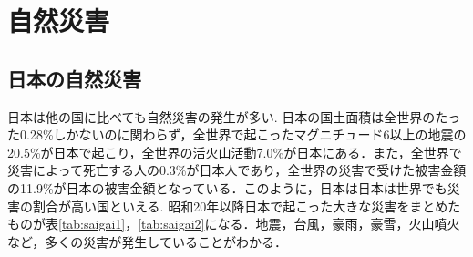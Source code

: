 \documentclass[a4j,11pt]{jsarticle}
\begin{document}



\newpage

\section{自然災害}
\subsection{日本の自然災害}
日本は他の国に比べても自然災害の発生が多い.
日本の国土面積は全世界のたった0.28\%しかないのに関わらず，全世界で起こったマグニチュード6以上の地震の20.5\%が日本で起こり，全世界の活火山活動7.0\%が日本にある．また，全世界で災害によって死亡する人の0.3\%が日本人であり，全世界の災害で受けた被害金額の11.9\%が日本の被害金額となっている．このように，日本は日本は世界でも災害の割合が高い国といえる\cite{oka1}.
昭和20年以降日本で起こった大きな災害をまとめたものが表\ref{tab:saigai1}，\ref{tab:saigai2}になる．地震，台風，豪雨，豪雪，火山噴火など，多くの災害が発生していることがわかる．
\end{document}
